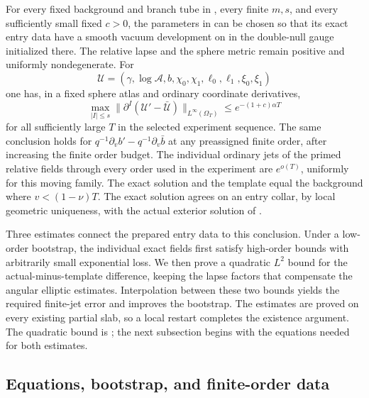 \begin{theorem}\label{thm:dn-comparison}
For every fixed background and branch tube in
, every finite $m,s$, and every sufficiently
small fixed $c>0$, the parameters in  can
be chosen so that its exact entry data have a smooth vacuum development
on  in the double-null gauge initialized there.
The relative lapse and the sphere metric remain positive and uniformly
nondegenerate.  For
\[
 \mathcal U=(\gamma,\log\mathcal A,b,\chi_0,\chi_1,
                       \ell_0,\ell_1,\xi_0,\xi_1)
\]
one has, in a fixed sphere atlas and ordinary coordinate derivatives,
\begin{equation}\label{dn:main-error}
 \max_{|I|\le s}\|\partial^I(\mathcal U'-\bar{\mathcal U})
                         \|_{L^\infty(\Omega_T)}
       \le e^{-(1+c)\alpha T}
\end{equation}
for all sufficiently large $T$ in the selected experiment sequence.
The same conclusion holds for
$q^{-1}\partial_vb'-q^{-1}\partial_v\bar b$ at any preassigned finite
order, after increasing the finite order budget.  The individual
ordinary jets of the primed relative fields through every order used
in the experiment are $e^{o(T)}$, uniformly for this moving family.
The exact solution and the template equal the background where
$v<(1-\nu)T$.  The exact solution agrees on an entry collar, by local
geometric uniqueness, with the actual exterior solution of
.
\end{theorem}

Three estimates connect the prepared entry data to this conclusion.
Under a low-order bootstrap, the individual exact fields first satisfy
high-order bounds with arbitrarily small exponential loss. We then prove
a quadratic $L^2$ bound for the actual-minus-template difference, keeping
the lapse factors that compensate the angular elliptic estimates.
Interpolation between these two bounds yields the required finite-jet
error and improves the bootstrap. The estimates are proved on every
existing partial slab, so a local restart completes the existence
argument. The quadratic bound is ; the next
subsection begins with the equations needed for both estimates.

\subsection{Equations, bootstrap, and finite-order data}

